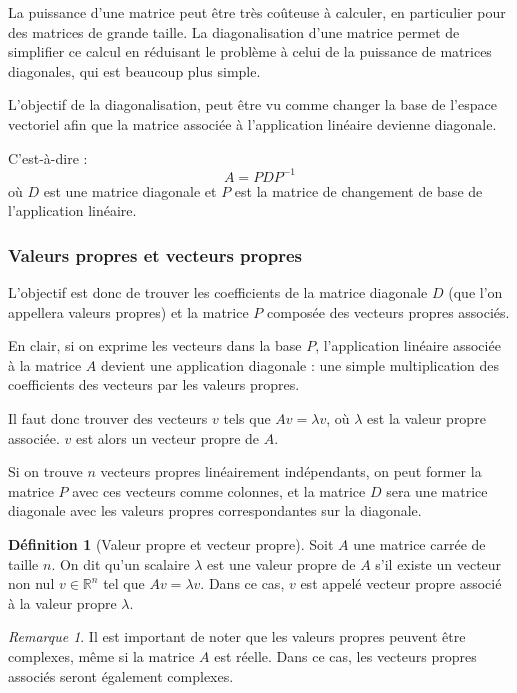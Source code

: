 \documentclass[11pt,a4paper]{article}
\numberwithin{equation}{section}
\theoremstyle{plain}
\theoremstyle{definition}
\newtheorem{definition}[theorem]{Définition}
\theoremstyle{remark}
\newtheorem*{remark}{Remarque}
\begin{document}
La puissance d'une matrice peut être très coûteuse à calculer, en particulier pour des matrices de grande taille. La diagonalisation d'une matrice permet de simplifier ce calcul en réduisant le problème à celui de la puissance de matrices diagonales, qui est beaucoup plus simple.

L'objectif de la diagonalisation, peut être vu comme changer la base de l'espace vectoriel afin que la matrice associée à l'application linéaire devienne diagonale.

C'est-à-dire :
\[
    A = PDP^{-1}
\]
où \(D\) est une matrice diagonale et \(P\) est la matrice de changement de base de l'application linéaire.

\subsubsection{Valeurs propres et vecteurs propres}

L'objectif est donc de trouver les coefficients de la matrice diagonale \(D\) (que l'on appellera valeurs propres) et la matrice $P$ composée des vecteurs propres associés.

En clair, si on exprime les vecteurs dans la base $P$, l'application linéaire associée à la matrice \(A\) devient une application diagonale : une simple multiplication des coefficients des vecteurs par les valeurs propres.

Il faut donc trouver des vecteurs \(v\) tels que \(Av = \lambda v\), où \(\lambda\) est la valeur propre associée. $v$ est alors un vecteur propre de \(A\).

Si on trouve $n$ vecteurs propres linéairement indépendants, on peut former la matrice \(P\) avec ces vecteurs comme colonnes, et la matrice \(D\) sera une matrice diagonale avec les valeurs propres correspondantes sur la diagonale.

\begin{definition}[Valeur propre et vecteur propre]
    Soit \(A\) une matrice carrée de taille \(n\). On dit qu'un scalaire \(\lambda\) est une valeur propre de \(A\) s'il existe un vecteur non nul \(v \in \mathbb{R}^n\) tel que \(Av = \lambda v\). Dans ce cas, \(v\) est appelé vecteur propre associé à la valeur propre \(\lambda\).
\end{definition}

\begin{remark}
Il est important de noter que les valeurs propres peuvent être complexes, même si la matrice \(A\) est réelle. Dans ce cas, les vecteurs propres associés seront également complexes.
\end{remark}
\end{document}
